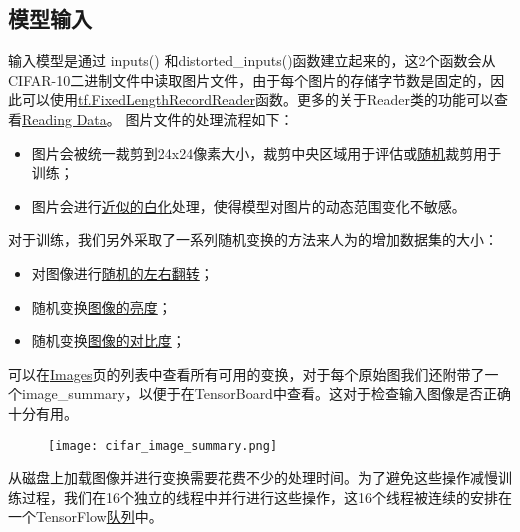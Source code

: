 {\subsection{模型输入}
输入模型是通过 inputs() 和distorted\_inputs()函数建立起来的，这2个函数会从CIFAR-10二进制文件中读取图片文件，由于每个图片的存储字节数是固定的，因此可以使用\href{https://www.tensorflow.org/api_docs/python/tf/FixedLengthRecordReader}{tf.FixedLengthRecordReader}函数。更多的关于Reader类的功能可以查看\href{https://www.tensorflow.org/api_guides/python/reading_data#reading_from_files}{Reading Data}。
图片文件的处理流程如下：
\begin{itemize}
\item 图片会被统一裁剪到24x24像素大小，裁剪中央区域用于评估或\href{https://www.tensorflow.org/api_docs/python/tf/random_crop}{随机}裁剪用于训练；
\item 图片会进行\href{https://www.tensorflow.org/api_docs/python/tf/image/per_image_standardization}{近似的白化}处理，使得模型对图片的动态范围变化不敏感。
\end{itemize}
对于训练，我们另外采取了一系列随机变换的方法来人为的增加数据集的大小：
\begin{itemize}
\item 对图像进行\href{https://www.tensorflow.org/api_docs/python/tf/image/random_flip_left_right}{随机的左右翻转}；
\item 随机变换\href{https://www.tensorflow.org/api_docs/python/tf/image/random_brightness}{图像的亮度}；
\item 随机变换\href{https://www.tensorflow.org/api_docs/python/tf/image/random_contrast}{图像的对比度}；
\end{itemize}
可以在\href{https://www.tensorflow.org/api_guides/python/image}{Images}页的列表中查看所有可用的变换，对于每个原始图我们还附带了一个image\_summary，以便于在TensorBoard中查看。这对于检查输入图像是否正确十分有用。
\begin{figure}[H]
\centering
\texttt{[image: cifar\_image\_summary.png]}
\end{figure}
从磁盘上加载图像并进行变换需要花费不少的处理时间。为了避免这些操作减慢训练过程，我们在16个独立的线程中并行进行这些操作，这16个线程被连续的安排在一个TensorFlow\href{https://www.tensorflow.org/api_docs/python/tf/train/shuffle_batch}{队列}中。
}
